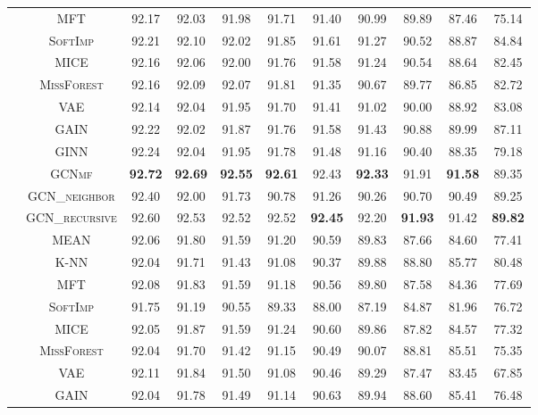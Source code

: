 \begin{table}[!pt]
{\begin{tabular}{c|c|ccccccccc}
& \textsc{MFT} & 92.17 & 92.03 & 91.98 & 91.71 & 91.40 & 90.99 & 89.89 & 87.46 & 75.14\\
& \textsc{SoftImp} & 92.21 & {92.10} & 92.02 & {91.85} & {91.61} & 91.27 & 90.52 & 88.87 & 84.84\\
& \textsc{MICE} & 92.16 & 92.06 & 92.00 & 91.76 & 91.58 & 91.24 & 90.54 & 88.64 & 82.45\\
& \textsc{MissForest} & 92.16 & 92.09 & {92.07} & 91.81 & 91.35 & 90.67 & 89.77 & 86.85 & 82.72\\
& \textsc{VAE} & 92.14 & 92.04 & 91.95 & 91.70 & 91.41 & 91.02 & 90.00 & 88.92 & 83.08\\
& \textsc{GAIN} & 92.22 & 92.02 & 91.87 & 91.76 & 91.58 & {91.43} & {90.88} & {89.99} & {87.11}\\
& \textsc{GINN} & {92.24} & 92.04 & 91.95 & 91.78 & 91.48 & 91.16 & 90.40 & 88.35 & 79.18\\
& \textsc{GCNmf} & \textbf{92.72} & \textbf{92.69} & \textbf{92.55} & \textbf{92.61} & 92.43 & \textbf{92.33} & 91.91 & \textbf{91.58} & 89.35\\ 
& \textsc{GCN\_neighbor}  & 92.40 & 92.00 & 91.73 & 90.78 & 91.26 & 90.26 & 90.70 & 90.49 & 89.25 \\
& \textsc{GCN\_recursive}  & 92.60 & 92.53 & 92.52 & 92.52 & \textbf{92.45} & 92.20 & \textbf{91.93} & 91.42 & \textbf{89.82} \\ 
\midrule
{} & \textsc{MEAN} & 92.06 & 91.80 & {91.59} & 91.20 & 90.59 & 89.83 & 87.66 & 84.60 & 77.41\\
& \textsc{K-NN} & 92.04 & 91.71 & 91.43 & 91.08 & 90.37 & 89.88 & 88.80 & {85.77} & {80.48}\\
& \textsc{MFT} & 92.08 & 91.83 & {91.59} & 91.18 & 90.56 & 89.80 & 87.58 & 84.36 & 77.69\\
& \textsc{SoftImp} & 91.75 & 91.19 & 90.55 & 89.33 & 88.00 & 87.19 & 84.87 & 81.96 & 76.72\\
& \textsc{MICE} & 92.05 & {91.87} & {91.59} & {91.24} & 90.60 & 89.86 & 87.82 & 84.57 & 77.32\\
& \textsc{MissForest} & 92.04 & 91.70 & 91.42 & 91.15 & 90.49 & {90.07} & {88.81} & 85.51 & 75.35\\
& \textsc{VAE} & {92.11} & 91.84 & 91.50 & 91.08 & 90.46 & 89.29 & 87.47 & 83.45 & 67.85\\
& \textsc{GAIN} & 92.04 & 91.78 & 91.49 & 91.14 & {90.63} & 89.94 & 88.60 & 85.41 & 76.48\\

\end{tabular}}
\end{table}
